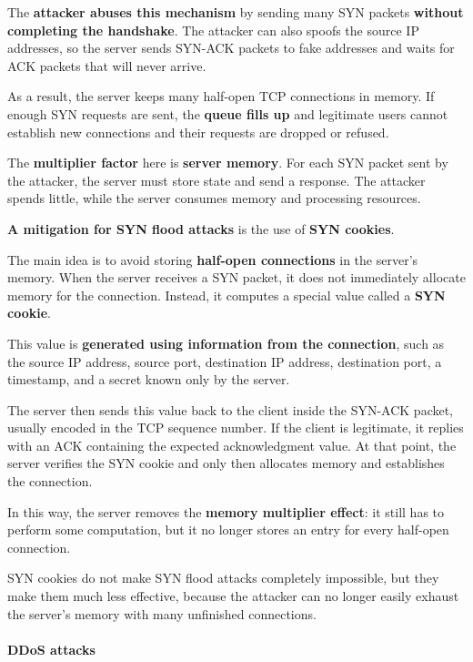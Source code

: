 \documentclass{article}
\begin{document}
The \textbf{attacker abuses this mechanism} by sending many SYN packets \textbf{without completing the handshake}. The attacker can also spoofs the source IP addresses, so the server sends SYN-ACK packets to fake addresses and waits for ACK packets that will never arrive.

As a result, the server keeps many half-open TCP connections in memory. If enough SYN requests are sent, the \textbf{queue fills up} and legitimate users cannot establish new connections and their requests are dropped or refused.

The \textbf{multiplier factor} here is \textbf{server memory}. For each SYN packet sent by the attacker, the server must store state and send a response. The attacker spends little, while the server consumes memory and processing resources.

\textbf{A mitigation for SYN flood attacks} is the use of \textbf{SYN cookies}.

The main idea is to avoid storing \textbf{half-open connections} in the server's memory. When the server receives a SYN packet, it does not immediately allocate memory for the connection. Instead, it computes a special value called a \textbf{SYN cookie}.

This value is \textbf{generated using information from the connection}, such as the source IP address, source port, destination IP address, destination port, a timestamp, and a secret known only by the server.

The server then sends this value back to the client inside the SYN-ACK packet, usually encoded in the TCP sequence number. If the client is legitimate, it replies with an ACK containing the expected acknowledgment value. At that point, the server verifies the SYN cookie and only then allocates memory and establishes the connection.

In this way, the server removes the \textbf{memory multiplier effect}: it still has to perform some computation, but it no longer stores an entry for every half-open connection.

SYN cookies do not make SYN flood attacks completely impossible, but they make them much less effective, because the attacker can no longer easily exhaust the server's memory with many unfinished connections.

\paragraph{DDoS attacks}
\end{document}
